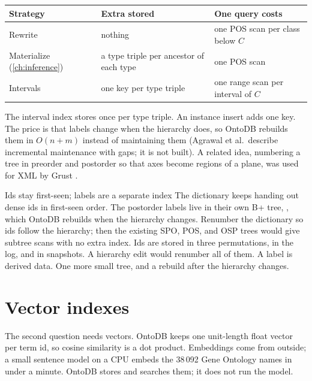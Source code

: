 \begin{center}
\begin{tabular}{@{}p{2.1cm}p{3.6cm}p{5.2cm}@{}}
\toprule
Strategy & Extra stored & One query costs \\
\midrule
Rewrite & nothing & one POS scan per class below $C$ \\
Materialize (\cref{ch:inference}) & a type triple per ancestor of each type & one POS scan \\
Intervals & one key per type triple & one range scan per interval of $C$ \\
\bottomrule
\end{tabular}
\end{center}

The interval index stores  once per type triple. An
instance insert adds one key. The price is that labels change when the hierarchy
does, so OntoDB rebuilds them in $O(n+m)$ instead of maintaining them
(Agrawal et al.\ describe incremental maintenance with gaps; it is not built). A
related idea, numbering a tree in preorder and postorder so that axes become
regions of a plane, was used for XML by Grust \cite{grust2002}.

\begin{decision}{Ids stay first-seen; labels are a separate index}
 The dictionary keeps handing out dense ids in first-seen order. The
postorder labels live in their own B+ tree, , which
OntoDB rebuilds when the hierarchy changes.
 Renumber the dictionary so ids follow the hierarchy; then the
existing SPO, POS, and OSP trees would give subtree scans with no extra index.
 Ids are stored in three permutations, in the log, and in snapshots.
A hierarchy edit would renumber all of them. A label is derived data.
 One more small tree, and a rebuild after the hierarchy changes.
\end{decision}

\section{Vector indexes}

The second question needs vectors. OntoDB keeps one unit-length float vector
per term id, so cosine similarity is a dot product. Embeddings come from
outside; a small sentence model on a CPU embeds the 38\,092 Gene Ontology names
in under a minute. OntoDB stores and searches them; it does not run the model.

